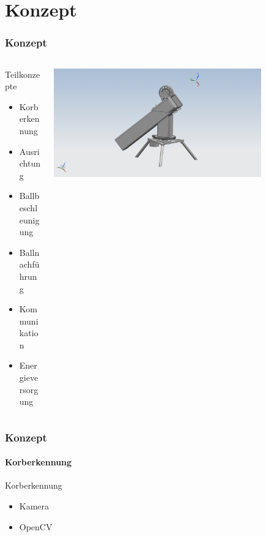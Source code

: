 \section{Konzept} %
\begin{frame}
    \frametitle{Konzept}
    \begin{columns}
        \begin{column}{0.4\textwidth}
            \begin{block}{Teilkonzepte}
                \begin{itemize}
                    \item<2-> Korberkennung
                    \item<3-> Ausrichtung
                    \item<4-> Ballbeschleunigung
                    \item<5-> Ballnachführung
                    \item<6-> Kommunikation
                    \item<7-> Energieversorgung
                \end{itemize}
            \end{block}
        \end{column}
        \begin{column}{0.6\textwidth}
            \centering
            \includegraphics[width=0.8\textwidth, trim = 150mm 50 150mm 10, clip]{../doc/fig/Gesamt_bg1.jpg}
        \end{column}
    \end{columns}
\end{frame}

\begin{frame}
    \frametitle{Konzept}
    \framesubtitle{Korberkennung}
    \begin{block}{Korberkennung}
        \begin{itemize}
            \item Kamera
            \item OpenCV
        \end{itemize}
    \end{block}
\end{frame}

